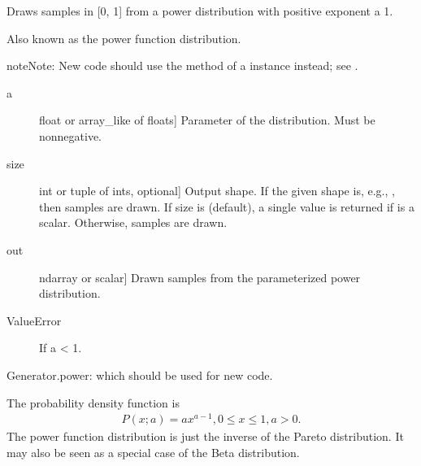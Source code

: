\documentclass[letterpaper,10pt,english]{sphinxmanual}
\begin{document}
\begin{fulllineitems}
\label{\detokenize{infrapy.utils:infrapy.utils.ref2sac.power}}
Draws samples in {[}0, 1{]} from a power distribution with positive
exponent a \sphinxhyphen{} 1.

Also known as the power function distribution.

\begin{sphinxadmonition}{note}{Note:}
New code should use the  method of a 
instance instead; see .
\end{sphinxadmonition}
\begin{description}
\item[{a}] \leavevmode{[}float or array\_like of floats{]}
Parameter of the distribution. Must be non\sphinxhyphen{}negative.

\item[{size}] \leavevmode{[}int or tuple of ints, optional{]}
Output shape.  If the given shape is, e.g., , then
 samples are drawn.  If size is  (default),
a single value is returned if  is a scalar.  Otherwise,
 samples are drawn.

\end{description}
\begin{description}
\item[{out}] \leavevmode{[}ndarray or scalar{]}
Drawn samples from the parameterized power distribution.

\end{description}
\begin{description}
\item[{ValueError}] \leavevmode
If a \textless{} 1.

\end{description}

Generator.power: which should be used for new code.

The probability density function is
\begin{equation*}
\begin{split}P(x; a) = ax^{a-1}, 0 \le x \le 1, a>0.\end{split}
\end{equation*}
The power function distribution is just the inverse of the Pareto
distribution. It may also be seen as a special case of the Beta
distribution.


\end{fulllineitems}
\end{document}
